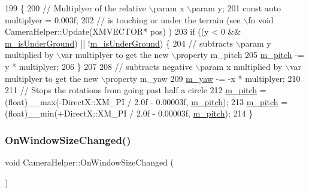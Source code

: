 \begin{DoxyCode}
199 \{
200     \textcolor{comment}{// Multiplyer of the relative \(\backslash\)param x  \(\backslash\)param y;}
201     \textcolor{keyword}{const} \textcolor{keyword}{auto} multiplyer = 0.003f;
202     \textcolor{comment}{// is touching or under the terrain (see \(\backslash\)fn void CameraHelper::Update(XMVECTOR* pos) )}
203     \textcolor{keywordflow}{if} ((y < 0 && \mbox{\hyperlink{class_camera_helper_a58fe7fb37f0bda549c7a8cc59fb58042}{m\_isUnderGround}}) || !\mbox{\hyperlink{class_camera_helper_a58fe7fb37f0bda549c7a8cc59fb58042}{m\_isUnderGround}}) \{
204         \textcolor{comment}{// subtracts \(\backslash\)param y multiplied by \(\backslash\)var multiplyer to get the new \(\backslash\)property m\_pitch}
205         \mbox{\hyperlink{class_camera_helper_ae2a32d581a829b05300d7298b5622469}{m\_pitch}} -= y * multiplyer;
206     \}
207 
208     \textcolor{comment}{// subtracts negative \(\backslash\)param x multiplied by \(\backslash\)var multiplyer to get the new \(\backslash\)property m\_yaw}
209     \mbox{\hyperlink{class_camera_helper_a9bdda4839839b4329188fc44517e8b01}{m\_yaw}} -= -x * multiplyer;
210 
211     \textcolor{comment}{// Stops the rotations from going past half a circle}
212     \mbox{\hyperlink{class_camera_helper_ae2a32d581a829b05300d7298b5622469}{m\_pitch}} = (float)\_\_max(-DirectX::XM\_PI / 2.0f - 0.00003f, \mbox{\hyperlink{class_camera_helper_ae2a32d581a829b05300d7298b5622469}{m\_pitch}});
213     \mbox{\hyperlink{class_camera_helper_ae2a32d581a829b05300d7298b5622469}{m\_pitch}} = (float)\_\_min(+DirectX::XM\_PI / 2.0f - 0.00003f, \mbox{\hyperlink{class_camera_helper_ae2a32d581a829b05300d7298b5622469}{m\_pitch}});
214 \}
\end{DoxyCode}
\mbox{\label{class_camera_helper_a2fc6faa8ce769fdedee3802719c2f372}} 
\subsubsection{\texorpdfstring{On\+Window\+Size\+Changed()}{OnWindowSizeChanged()}}
{\footnotesize\ttfamily void Camera\+Helper\+::\+On\+Window\+Size\+Changed (\begin{DoxyParamCaption}{ }\end{DoxyParamCaption})}




